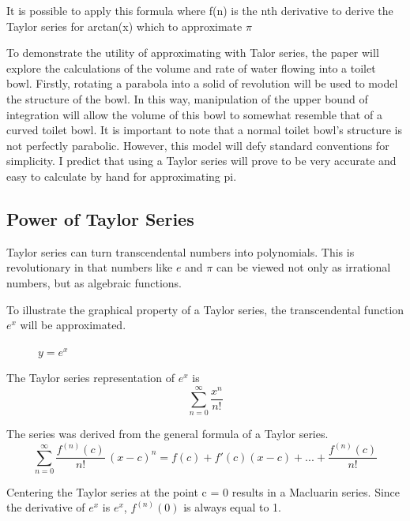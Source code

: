 \documentclass[12pt, titlepage]{article}
\begin{document}
It is possible to apply this formula where f(n) is the nth derivative to derive the Taylor series for arctan(x) which to approximate \(\pi\)

To demonstrate the utility of approximating with Talor series, the paper will explore the calculations of the volume and rate of water flowing into a toilet bowl. Firstly, rotating a parabola into a solid of revolution will be used to model the structure of the bowl. In this way, manipulation of the upper bound of integration will allow the volume of this bowl to somewhat resemble that of a curved toilet bowl. It is important to note that a normal toilet bowl's structure is not perfectly parabolic. However, this model will defy standard conventions for simplicity. I predict that using a Taylor series will prove to be very accurate and easy to calculate by hand for approximating pi. 

\subsection{Power of Taylor Series}
Taylor series can turn transcendental numbers into polynomials. This is revolutionary in that numbers like \(e\) and \(\pi\) can be viewed not only as irrational numbers, but as algebraic functions.

To illustrate the graphical property of a Taylor series, the transcendental function \(e^{x}\) will be approximated.
\begin{figure}[H]
\centering
    \caption[]{\(y=e^x\)}
\end{figure}

The Taylor series representation of \(e^{x}\) is  
\begin{equation}
  \sum_{n=0}^{\infty} \frac{x^{n}}{n!}
\end{equation}

The series was derived from the general formula of a Taylor series.
\begin{equation}
  \sum_{n=0}^{\infty} \frac{f^{(n)}(c)}{n!} \, (x-c)^{n} = f(c) + f'(c)(x-c) + ... +  \frac{f^{(n)}(c)}{n!}
\end{equation}

Centering the Taylor series at the point c = 0 results in a Macluarin series. Since the derivative of \(e^{x}\) is \(e^{x}\), \(f^{(n)}(0)\) is always equal to 1.
\end{document}
